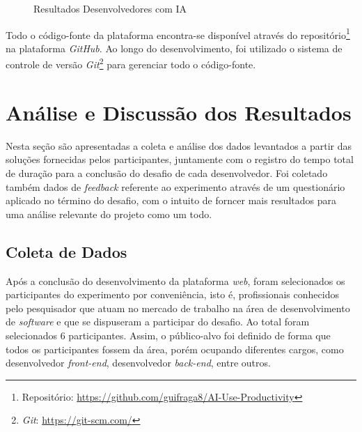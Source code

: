 \documentclass[english,brazilian]{UNISINOSartigo} %
\begin{document}
\begin{figure}[ht]
    \caption{Resultados Desenvolvedores com IA}
    \label{fig:resultados_com_ia_admin}
    \centering
    \footnotesize
    \begin{minipage}{.9\textwidth}
        \centering
    \end{minipage}
\end{figure}
\FloatBarrier

Todo o código-fonte da plataforma encontra-se disponível através do repositório\footnote{Repositório: \url{https://github.com/guifraga8/AI-Use-Productivity}} na plataforma \textit{GitHub}. Ao longo do desenvolvimento, foi utilizado o sistema de controle de versão \textit{Git}\footnote{\textit{Git}: \url{https://git-scm.com/}} para gerenciar todo o código-fonte.

\section{Análise e Discussão dos Resultados}

Nesta seção são apresentadas a coleta e análise dos dados levantados a partir das soluções fornecidas pelos participantes, juntamente com o registro do tempo total de duração para a conclusão do desafio de cada desenvolvedor. Foi coletado também dados de \textit{feedback} referente ao experimento através de um questionário aplicado no término do desafio, com o intuito de forncer mais resultados para uma análise relevante do projeto como um todo.

\subsection{Coleta de Dados}

Após a conclusão do desenvolvimento da plataforma \textit{web}, foram selecionados os participantes do experimento por conveniência, isto é, profissionais conhecidos pelo pesquisador que atuam no mercado de trabalho na área de desenvolvimento de \textit{software} e que se dispuseram a participar do desafio. Ao total foram selecionados 6 participantes. Assim, o público-alvo foi definido de forma que todos os participantes fossem da área, porém ocupando diferentes cargos, como desenvolvedor \textit{front-end}, desenvolvedor \textit{back-end}, entre outros.
\end{document}
